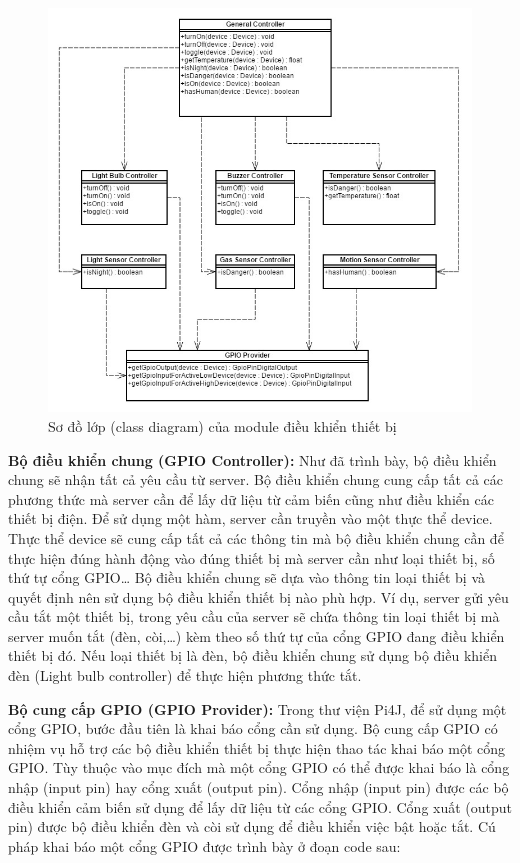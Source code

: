\documentclass[11pt,a4paper,oneside]{book}
\begin{document}
\begin{figure}[h]
  \centering
     \includegraphics[scale=0.5]{6-module-dieu-khien-class-diagram}
  \caption{Sơ đồ lớp (class diagram) của module điều khiển thiết bị}\label{fig:6-module-dieu-khien-class-diagram}
\end{figure}

\textbf{Bộ điều khiển chung (GPIO Controller):} Như đã trình bày, bộ điều khiển chung sẽ nhận tất cả yêu cầu từ server. Bộ điều khiển chung cung cấp tất cả các phương thức mà server cần để lấy dữ liệu từ cảm biến cũng như điều khiển các thiết bị điện. Để sử dụng một hàm, server cần truyền vào một thực thể device. Thực thể device sẽ cung cấp tất cả các thông tin mà bộ điều khiển chung cần để thực hiện đúng hành động vào đúng thiết bị mà server cần như loại thiết bị, số thứ tự cổng GPIO… Bộ điều khiển chung sẽ dựa vào thông tin loại thiết bị và quyết định nên sử dụng bộ điều khiển thiết bị nào phù hợp. Ví dụ, server gửi yêu cầu tắt một thiết bị, trong yêu cầu của server sẽ chứa thông tin loại thiết bị mà server muốn tắt (đèn, còi,…) kèm theo số thứ tự của cổng GPIO đang điều khiển thiết bị đó. Nếu loại thiết bị là đèn, bộ điều khiển chung sử dụng bộ điều khiển đèn (Light bulb controller) để thực hiện phương thức tắt.

\textbf{Bộ cung cấp GPIO (GPIO Provider):} Trong thư viện Pi4J, để sử dụng một cổng GPIO, bước đầu tiên là khai báo cổng cần sử dụng. Bộ cung cấp GPIO có nhiệm vụ hỗ trợ các bộ điều khiển thiết bị thực hiện thao tác khai báo một cổng GPIO. Tùy thuộc vào mục đích mà một cổng GPIO có thể được khai báo là cổng nhập (input pin) hay cổng xuất (output pin). Cổng nhập (input pin) được các bộ điều khiển cảm biến sử dụng để lấy dữ liệu từ các cổng GPIO. Cổng xuất (output pin) được bộ điều khiển đèn và còi sử dụng để điều khiển việc bật hoặc tắt. Cú pháp khai báo một cổng GPIO được trình bày ở đoạn code sau:
\end{document}
